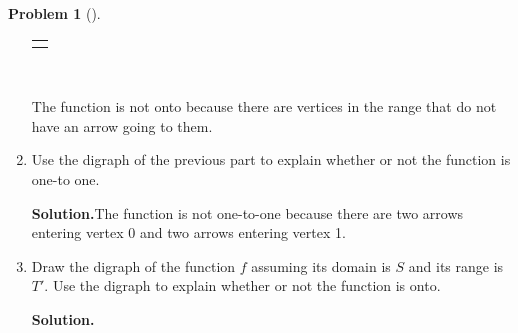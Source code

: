 \documentclass[10pt,]{book}
\theoremstyle{plain}
\theoremstyle{definition}
\newtheorem{activity}[project]{Problem}
\theoremstyle{definition}
\numberwithin{equation}{chapter}
\newlength{\panelmax}
\begin{document}
\begin{activity}[]
\begin{enumerate}[font=\bfseries,label=(\alph*),ref=\alph*]
{{{{\begin{tikzpicture}[yscale=0.75]
  \end{tikzpicture}
}
}}
\newlength{\phAVimage}\setlength{\phAVimage}{\ht\panelboxAVimage+\dp\panelboxAVimage}
\settototalheight{\phAVimage}{\usebox{\panelboxAVimage}}
\setlength{\panelmax}{\maxof{\panelmax}{\phAVimage}}
\leavevmode%
\setlength{\tabcolsep}{0\linewidth}
\par\medskip\noindent
\hspace*{0.25\linewidth}%
\begin{tabular}{@{}*{1}{c}@{}}
\begin{minipage}[c][\panelmax][t]{0.5\linewidth}\usebox{\panelboxAVimage}\end{minipage}\end{tabular}\\
}%
\par
The function is not onto because there are vertices in the range that do not have an arrow going to them.%
\item\label{task-243} Use the digraph of the previous part to explain whether or not the function is one-to one.%
\par\medskip\noindent%
\textbf{Solution.}\quad The function is not one-to-one because there are two arrows entering vertex 0 and two arrows entering vertex 1.%
\item\label{task-244} Draw the digraph of the function \(f\) assuming its domain is \(S\) and its range is \(T'\). Use the digraph to explain whether or not the function is onto.%
\par\medskip\noindent%
\textbf{Solution.}\quad %
{%
\setlength{\panelmax}{0pt}
\newsavebox{\panelboxAWimage}
}
\end{enumerate}
\end{activity}
\end{document}
